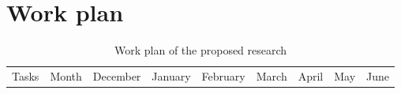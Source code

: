 \documentclass[../main/main.tex]{subfiles}
\begin{document}
	\section{Work plan}
	\begin{table}[h!]
		\centering
			\caption{Work plan of the proposed research}
			\begin{adjustbox}{angle=90, width=.75\textwidth}
			\begin{tabular}{|c|c|c|c|c|c|c|c|c|c|c|c|c|c|c|c|c|c|c|c|c|c|c|c|c|c|c|c|c|c|}
				\hline
				\multirow{2}{4em}{Tasks} & Month & \multicolumn{4}{|c|}{December} & \multicolumn{4}{|c|}{January}   & \multicolumn{4}{|c|}{February} & \multicolumn{4}{|c|}{March}   &  \multicolumn{4}{|c|}{April}  & \multicolumn{4}{|c|}{May}   &  \multicolumn{4}{|c|}{June}  \\
				

\end{tabular}
\end{adjustbox}
\end{table}
\end{document}
